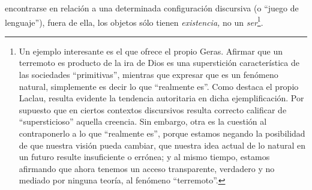 encontrarse en relación a una determinada configuración discursiva (o \enquote{juego de lenguaje}), fuera de ella, los objetos sólo tienen \emph{existencia,} no un \emph{ser}\footnote{Un ejemplo interesante es el que ofrece el propio Geras. Afirmar que un terremoto es producto de la ira de Dios es una superstición característica de las sociedades \enquote{primitivas}, mientras que expresar que es un fenómeno natural, simplemente es decir lo que \enquote{realmente es}. Como destaca el propio Laclau, resulta evidente la tendencia autoritaria en dicha ejemplificación. Por supuesto que en ciertos contextos discursivos  resulta correcto calificar de \enquote{supersticioso} aquella creencia. Sin embargo, otra es la cuestión al contraponerlo a lo que \enquote{realmente es}, porque estamos negando la posibilidad de que nuestra visión pueda cambiar, que nuestra idea actual de lo natural en un futuro resulte insuficiente o errónea; y al mismo tiempo, estamos afirmando que ahora tenemos un acceso transparente, verdadero y no mediado por ninguna teoría, al fenómeno \enquote{terremoto}.}.
%
